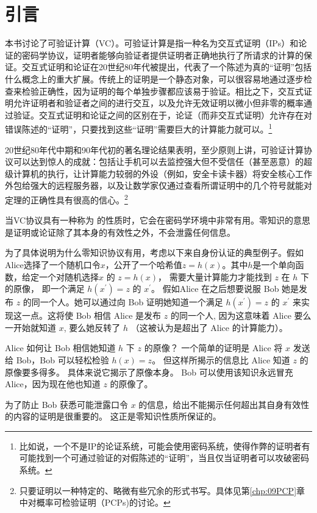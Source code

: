 
\chapter{引言}\label{chp:01Introduction}


本书讨论了可验证计算（VC）。可验证计算是指一种名为交互式证明（IPs）和论证的密码学协议，证明者能够向验证者提供证明者正确地执行了所请求的计算的保证。交互式证明和论证在20世纪80年代被提出，代表了一个陈述为真的“证明”包括什么概念上的重大扩展。传统上的证明是一个静态对象，可以很容易地通过逐步检查来检验正确性，因为证明的每个单独步骤都应该易于验证。相比之下，交互式证明允许证明者和验证者之间的进行交互，以及允许无效证明以微小但非零的概率通过验证。交互式证明和论证之间的区别在于，论证（而非交互式证明）允许存在对错误陈述的“证明”，只要找到这些“证明”需要巨大的计算能力就可以。\footnote{比如说，一个不是IP的论证系统，可能会使用密码系统，使得作弊的证明者有可能找到一个可通过验证的对假陈述的“证明”，当且仅当证明者可以攻破密码系统。}

20世纪80年代中期和90年代初的著名理论结果表明，至少原则上讲，可验证计算协议可以达到惊人的成就：包括让手机可以去监控强大但不受信任（甚至恶意）的超级计算机的执行，让计算能力较弱的外设（例如，安全卡读卡器）将安全核心工作外包给强大的远程服务器，以及让数学家仅通过查看所谓证明中的几个符号就能对定理的正确性具有很高的信心。\footnote{只要证明以一种特定的、略微有些冗余的形式书写。具体见第\ref{chp:09PCP}章中对概率可检验证明（PCPs)的讨论。}


当VC协议具有一种称为 的性质时，它会在密码学环境中非常有用。零知识的意思是证明或论证除了其本身的有效性之外，不会泄露任何信息。

为了具体说明为什么零知识协议有用，考虑以下来自身份认证的典型例子。假如Alice选择了一个随机口令$x$，公开了一个哈希值$z=h(x)$。其中$h$是一个单向函数，给定一个对随机选择$x$ 的 $z=h(x)$， 需要大量计算能力才能找到 $z$ 在 $h$ 下的原像， 即一个满足 $h\left(x^{\prime}\right)=z$ 的 $x^{\prime}$。 
假如Alice 在之后想要说服 Bob 她是发布 $z$ 的同一个人。她可以通过向 Bob 证明她知道一个满足 $h\left(x^{\prime}\right)=z$ 的 $x^{\prime}$ 来实现这一点。这将使 Bob 相信 Alice 是发布 $z$ 的同一个人, 因为这意味着 Alice 要么一开始就知道 $x$, 要么她反转了 $h$ （这被认为是超出了 Alice 的计算能力）。

Alice 如何让 Bob 相信她知道 $h$ 下 $z$ 的原像？ 一个简单的证明是 Alice 将 $x$ 发送给 Bob，Bob 可以轻松检验 $h(x)=z$。 但这样所揭示的信息比 Alice 知道 $z$ 的原像要多得多。 具体来说它揭示了原像本身。 Bob 可以使用该知识永远冒充 Alice，因为现在他也知道 $z$ 的原像了。

为了防止 Bob 获悉可能泄露口令 $x$ 的信息，给出不能揭示任何超出其自身有效性的内容的证明是很重要的。 这正是零知识性质所保证的。

